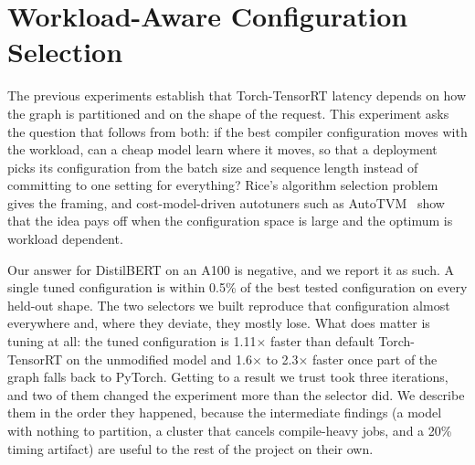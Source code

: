 %
\providecommand{\EFourFigDir}{figures}
\providecommand{\cfg}[1]{\texttt{#1}}

\section{Workload-Aware Configuration Selection}
\label{sec:e4}

The previous experiments establish that Torch-TensorRT latency depends on how
the graph is partitioned and on the shape of the request. This experiment asks
the question that follows from both: if the best compiler configuration moves
with the workload, can a cheap model learn where it moves, so that a deployment
picks its configuration from the batch size and sequence length instead of
committing to one setting for everything? Rice's algorithm selection
problem~\cite{rice1976algorithm} gives the framing, and cost-model-driven
autotuners such as AutoTVM~\cite{chen2018autotvm} show that the idea pays off
when the configuration space is large and the optimum is workload dependent.

Our answer for DistilBERT on an A100 is negative, and we report it as such. A
single tuned configuration is within 0.5\% of the best tested configuration on
every held-out shape. The two selectors we built reproduce that configuration
almost everywhere and, where they deviate, they mostly lose. What does matter
is tuning at all: the tuned configuration is 1.11$\times$ faster than default
Torch-TensorRT on the unmodified model and 1.6$\times$ to 2.3$\times$ faster
once part of the graph falls back to PyTorch. Getting to a result we trust took
three iterations, and two of them changed the experiment more than the
selector did. We describe them in the order they happened, because the
intermediate findings (a model with nothing to partition, a cluster that
cancels compile-heavy jobs, and a 20\% timing artifact) are useful to the rest
of the project on their own.

